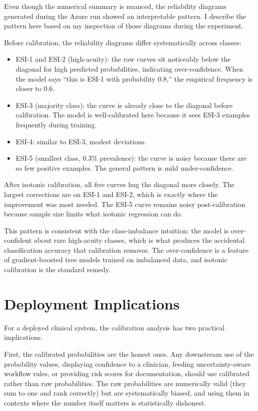 Even though the numerical summary is nuanced, the reliability diagrams generated during the Azure run showed an interpretable pattern. I describe the pattern here based on my inspection of those diagrams during the experiment.

Before calibration, the reliability diagrams differ systematically across classes:

\begin{itemize}
 \item ESI-1 and ESI-2 (high-acuity): the raw curves sit noticeably below the diagonal for high predicted probabilities, indicating over-confidence. When the model says ``this is ESI-1 with probability $0.8$,'' the empirical frequency is closer to $0.6$.
 \item ESI-3 (majority class): the curve is already close to the diagonal before calibration. The model is well-calibrated here because it sees ESI-3 examples frequently during training.
 \item ESI-4: similar to ESI-3, modest deviations.
 \item ESI-5 (smallest class, $0.3\%$ prevalence): the curve is noisy because there are so few positive examples. The general pattern is mild under-confidence.
\end{itemize}

After isotonic calibration, all five curves hug the diagonal more closely. The largest corrections are on ESI-1 and ESI-2, which is exactly where the improvement was most needed. The ESI-5 curve remains noisy post-calibration because sample size limits what isotonic regression can do.

This pattern is consistent with the class-imbalance intuition: the model is over-confident about rare high-acuity classes, which is what produces the accidental classification accuracy that calibration removes. The over-confidence is a feature of gradient-boosted tree models trained on imbalanced data, and isotonic calibration is the standard remedy.

\section{Deployment Implications}

For a deployed clinical system, the calibration analysis has two practical implications.

First, the calibrated probabilities are the honest ones. Any downstream use of the probability values, displaying confidence to a clinician, feeding uncertainty-aware workflow rules, or providing risk scores for documentation, should use calibrated rather than raw probabilities. The raw probabilities are numerically valid (they sum to one and rank correctly) but are systematically biased, and using them in contexts where the number itself matters is statistically dishonest.

